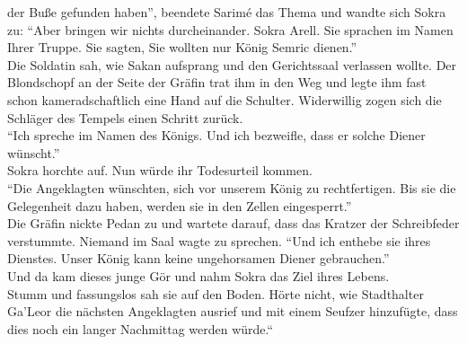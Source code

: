 der Buße gefunden haben'', beendete Sarimé das Thema und wandte sich Sokra zu: ``Aber bringen wir 
nichts durcheinander. Sokra Arell. Sie sprachen im Namen Ihrer Truppe. Sie sagten, Sie wollten nur 
König Semric dienen.''\\
Die Soldatin sah, wie Sakan aufsprang und den Gerichtssaal verlassen wollte. Der Blondschopf an der 
Seite der Gräfin trat ihm in den Weg und legte ihm fast schon kameradschaftlich eine Hand auf die 
Schulter. Widerwillig zogen sich die Schläger des Tempels einen Schritt zurück.\\
``Ich spreche im Namen des Königs. Und ich bezweifle, dass er solche Diener wünscht.''\\
Sokra horchte auf. Nun würde ihr Todesurteil kommen.\\
``Die Angeklagten wünschten, sich vor unserem König zu rechtfertigen. Bis sie die Gelegenheit 
dazu haben, werden sie in den Zellen eingesperrt.''\\
Die Gräfin nickte Pedan zu und wartete darauf, dass das Kratzer der Schreibfeder verstummte. 
Niemand im Saal wagte zu sprechen. ``Und ich enthebe sie ihres Dienstes. Unser König kann keine 
ungehorsamen Diener gebrauchen.''\\
Und da kam dieses junge Gör und nahm Sokra das Ziel ihres Lebens.\\
Stumm und fassungslos sah sie auf den Boden. Hörte nicht, wie Stadthalter Ga'Leor die nächsten 
Angeklagten ausrief und mit einem Seufzer hinzufügte, dass dies noch ein langer Nachmittag werden 
würde.``\\
